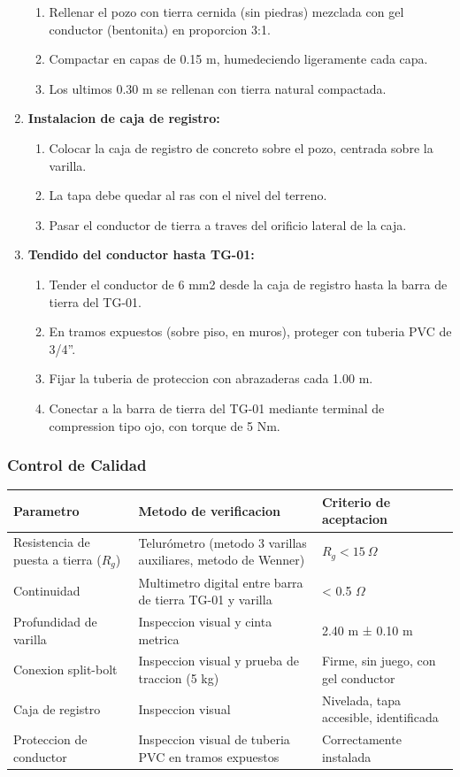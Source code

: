 \begin{enumerate}
  \begin{enumerate}
    \item Rellenar el pozo con tierra cernida (sin piedras) mezclada con gel conductor (bentonita) en proporcion 3:1.
    \item Compactar en capas de 0.15 m, humedeciendo ligeramente cada capa.
    \item Los ultimos 0.30 m se rellenan con tierra natural compactada.
  \end{enumerate}
  \item \textbf{Instalacion de caja de registro:}
  \begin{enumerate}
    \item Colocar la caja de registro de concreto sobre el pozo, centrada sobre la varilla.
    \item La tapa debe quedar al ras con el nivel del terreno.
    \item Pasar el conductor de tierra a traves del orificio lateral de la caja.
  \end{enumerate}
  \item \textbf{Tendido del conductor hasta TG-01:}
  \begin{enumerate}
    \item Tender el conductor de 6 mm2 desde la caja de registro hasta la barra de tierra del TG-01.
    \item En tramos expuestos (sobre piso, en muros), proteger con tuberia PVC de 3/4''.
    \item Fijar la tuberia de proteccion con abrazaderas cada 1.00 m.
    \item Conectar a la barra de tierra del TG-01 mediante terminal de compression tipo ojo, con torque de 5 Nm.
  \end{enumerate}
\end{enumerate}

\subsubsection{Control de Calidad}

\begin{longtable}{L{4.5cm} L{4.5cm} L{4.5cm}}
\toprule
\textbf{Parametro} & \textbf{Metodo de verificacion} & \textbf{Criterio de aceptacion} \\
\midrule
Resistencia de puesta a tierra ($R_g$) & Telurómetro (metodo 3 varillas auxiliares, metodo de Wenner) & $R_g < 15\ \Omega$ \\
Continuidad & Multimetro digital entre barra de tierra TG-01 y varilla & < 0.5 $\Omega$ \\
Profundidad de varilla & Inspeccion visual y cinta metrica & 2.40 m ± 0.10 m \\
Conexion split-bolt & Inspeccion visual y prueba de traccion (5 kg) & Firme, sin juego, con gel conductor \\
Caja de registro & Inspeccion visual & Nivelada, tapa accesible, identificada \\
Proteccion de conductor & Inspeccion visual de tuberia PVC en tramos expuestos & Correctamente instalada \\
\bottomrule
\end{longtable}

